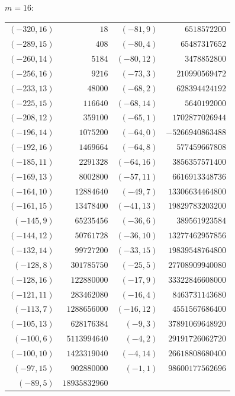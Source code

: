\documentclass[11pt]{amsart}
\theoremstyle{definition}
\begin{document}
\noindent$m=16$:\nopagebreak\\[2pt]
{\scriptsize\begin{tabular}{@{}r@{\ \ }r@{\qquad}r@{\ \ }r@{}}
$(-320,16)$ & $18$ & $(-81,9)$ & $6518572200$ \\
$(-289,15)$ & $408$ & $(-80,4)$ & $65487317652$ \\
$(-260,14)$ & $5184$ & $(-80,12)$ & $3478852800$ \\
$(-256,16)$ & $9216$ & $(-73,3)$ & $210990569472$ \\
$(-233,13)$ & $48000$ & $(-68,2)$ & $628394424192$ \\
$(-225,15)$ & $116640$ & $(-68,14)$ & $5640192000$ \\
$(-208,12)$ & $359100$ & $(-65,1)$ & $1702877026944$ \\
$(-196,14)$ & $1075200$ & $(-64,0)$ & $-5266940863488$ \\
$(-192,16)$ & $1469664$ & $(-64,8)$ & $577459667808$ \\
$(-185,11)$ & $2291328$ & $(-64,16)$ & $3856357571400$ \\
$(-169,13)$ & $8002800$ & $(-57,11)$ & $6616913348736$ \\
$(-164,10)$ & $12884640$ & $(-49,7)$ & $13306634464800$ \\
$(-161,15)$ & $13478400$ & $(-41,13)$ & $19829783203200$ \\
$(-145,9)$ & $65235456$ & $(-36,6)$ & $389561923584$ \\
$(-144,12)$ & $50761728$ & $(-36,10)$ & $13277462957856$ \\
$(-132,14)$ & $99727200$ & $(-33,15)$ & $19839548764800$ \\
$(-128,8)$ & $301785750$ & $(-25,5)$ & $27708909940080$ \\
$(-128,16)$ & $122880000$ & $(-17,9)$ & $33322846608000$ \\
$(-121,11)$ & $283462080$ & $(-16,4)$ & $8463731143680$ \\
$(-113,7)$ & $1288656000$ & $(-16,12)$ & $4551567686400$ \\
$(-105,13)$ & $628176384$ & $(-9,3)$ & $37891069648920$ \\
$(-100,6)$ & $5113994640$ & $(-4,2)$ & $29191726062720$ \\
$(-100,10)$ & $1423319040$ & $(-4,14)$ & $26618808680400$ \\
$(-97,15)$ & $902880000$ & $(-1,1)$ & $98600177562696$ \\
$(-89,5)$ & $18935832960$ & & \\
\end{tabular}}\par\medskip
\end{document}
